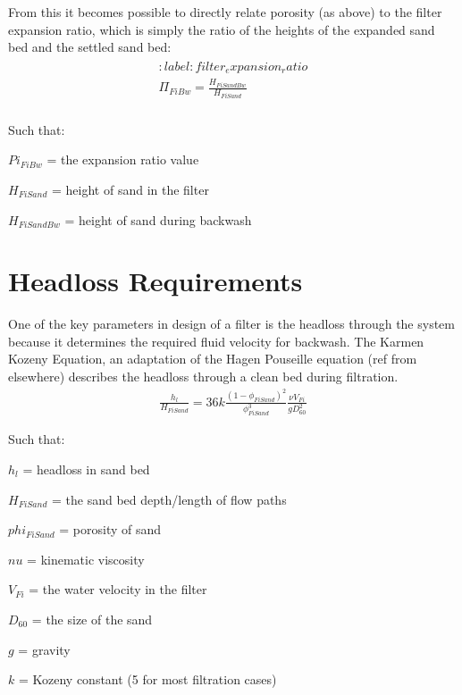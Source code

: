 \documentclass[letterpaper,10pt,english]{sphinxmanual}
\begin{document}
From this it becomes possible to directly relate porosity (as above) to the filter expansion ratio, which is simply the ratio of the heights of the expanded sand bed and the settled sand bed:
\begin{align}\label{equation:Filtration/Filtration_Design:Filtration/Filtration_Design:0}\!\begin{aligned}
:label: filter_expansion_ratio\\
\Pi_{FiBw} = \frac{H_{FiSandBw}}{H_{FiSand}}\\
\end{aligned}\end{align}
\begin{DUlineblock}{0em}
\item[] Such that:
\item[] \(Pi_{FiBw}\) = the expansion ratio value
\item[] \(H_{FiSand}\) = height of sand in the filter
\item[] \(H_{FiSandBw}\) = height of sand during backwash
\end{DUlineblock}


\section{Headloss Requirements}
\label{\detokenize{Filtration/Filtration_Design:headloss-requirements}}\label{\detokenize{Filtration/Filtration_Design:heading-headloss-requirements}}
One of the key parameters in design of a filter is the headloss through the system because it determines the required fluid velocity for backwash. The Karmen Kozeny Equation, an adaptation of the Hagen Pouseille equation (ref from elsewhere) describes the headloss through a clean bed during filtration.
\begin{equation}\label{equation:Filtration/Filtration_Design:karmen_kozeny_clean_bed}
\begin{split} \frac{h_l}{H_{FiSand}} = 36 k \frac{\left( 1 - \phi_{FiSand} \right)^2}{\phi_{FiSand}^3} \frac{\nu V_{Fi}}{g D_{60}^2}\end{split}
\end{equation}
\begin{DUlineblock}{0em}
\item[] Such that:
\item[] \(h_l\) = headloss in sand bed
\item[] \(H_{FiSand}\) = the sand bed depth/length of flow paths
\item[] \(phi_{FiSand}\) = porosity of sand
\item[] \(nu\) = kinematic viscosity
\item[] \(V_{Fi}\) = the water velocity in the filter
\item[] \(D_{60}\) = the size of the sand
\item[] \(g\) = gravity
\item[] \(k\) = Kozeny constant (5 for most filtration cases)
\end{DUlineblock}
\end{document}
